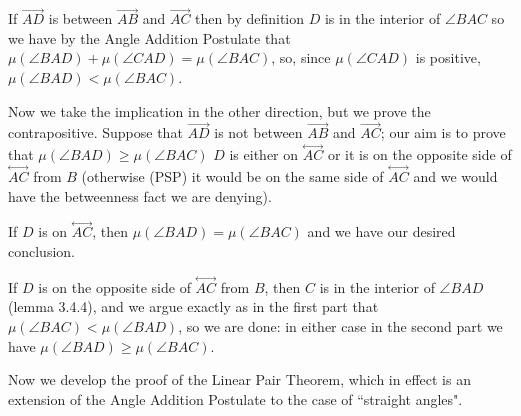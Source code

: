 \documentclass[12pt]{article}
\newcommand\Line[1]{\overset{\leftrightarrow}{#1}}
\begin{document}
\begin{description}
If $\overrightarrow {AD}$ is between
$\overrightarrow{AB}$ and $\overrightarrow{AC}$ then by definition $D$ is in the interior of $\angle BAC$ so
we have by the Angle Addition Postulate that $\mu(\angle BAD) + \mu(\angle CAD) = \mu(\angle BAC)$, so, 
since $\mu(\angle CAD)$ is positive, $\mu(\angle BAD) < \mu(\angle BAC)$.

Now we take the implication in the other direction, but we prove the contrapositive.  Suppose that $\overrightarrow {AD}$ is not between
$\overrightarrow{AB}$ and $\overrightarrow{AC}$;  our aim is to prove that $\mu(\angle BAD) \geq \mu(\angle BAC)$
$D$ is either on $\Line{AC}$ or it is on the opposite side of $\Line{AC}$ from $B$ (otherwise (PSP) it would be on the same side of $\Line{AC}$ and we would have the betweenness fact we are denying).

If $D$ is on $\Line{AC}$, then $\mu(\angle BAD) = \mu(\angle BAC)$ and we have our desired conclusion.

If $D$ is on the opposite side of $\Line{AC}$ from $B$, then $C$ is in the interior of $\angle BAD$ (lemma 3.4.4), and we argue
exactly as in the first part that $\mu(\angle BAC) < \mu(\angle BAD)$, so we are done:  in either case in the second part we have $\mu(\angle BAD) \geq \mu(\angle BAC)$.


\end{description}

Now we develop the proof of the Linear Pair Theorem, which in effect is an extension of the Angle Addition Postulate to the case of ``straight angles".
\end{document}
